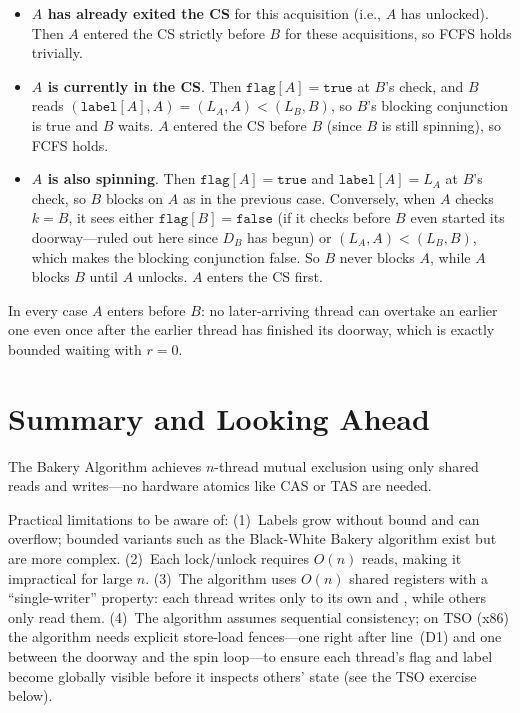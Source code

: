 \begin{itemize}[nosep,leftmargin=2.2em]
  \item \textbf{$A$ has already exited the CS} for this acquisition (i.e.,
        $A$ has unlocked). Then $A$ entered the CS strictly before $B$ for
        these acquisitions, so FCFS holds trivially.
  \item \textbf{$A$ is currently in the CS}. Then $\texttt{flag}[A] =
        \texttt{true}$ at $B$'s check, and $B$ reads
        $(\texttt{label}[A], A) = (L_A, A) < (L_B, B)$, so $B$'s blocking
        conjunction is true and $B$ waits. $A$ entered the CS before $B$
        (since $B$ is still spinning), so FCFS holds.
  \item \textbf{$A$ is also spinning}. Then $\texttt{flag}[A] = \texttt{true}$
        and $\texttt{label}[A] = L_A$ at $B$'s check, so $B$ blocks on $A$ as
        in the previous case. Conversely, when $A$ checks $k=B$, it sees
        either $\texttt{flag}[B] = \texttt{false}$ (if it checks before $B$
        even started its doorway---ruled out here since $D_B$ has begun)
        or $(L_A, A) < (L_B, B)$, which makes the blocking conjunction
        false. So $B$ never blocks $A$, while $A$ blocks $B$ until $A$
        unlocks. $A$ enters the CS first.
\end{itemize}

In every case $A$ enters before $B$: no later-arriving thread can overtake an
earlier one even once after the earlier thread has finished its doorway, which
is exactly bounded waiting with $r=0$.

\section{Summary and Looking Ahead}

The Bakery Algorithm achieves $n$-thread mutual exclusion using only shared reads
and writes---no hardware atomics like CAS or TAS are needed.

\begin{ppnote}
\par
Practical limitations to be aware of: (1)~Labels grow without bound and can
overflow; bounded variants such as the Black-White Bakery algorithm exist but
are more complex. (2)~Each lock/unlock requires $O(n)$ reads, making it
impractical for large $n$. (3)~The algorithm uses $O(n)$ shared registers with
a ``single-writer'' property: each thread writes only to its own
 and , while others only read them.
(4)~The algorithm assumes sequential consistency; on TSO (x86) the algorithm
needs explicit store-load fences---one right after line~(D1) and one
between the doorway and the spin loop---to ensure each thread's flag and
label become globally visible before it inspects others' state (see the
TSO exercise below).
\end{ppnote}

